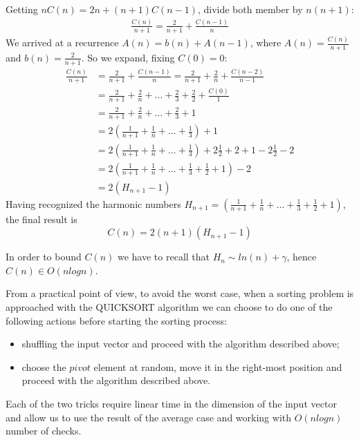 Getting $nC(n) = 2n + (n+1)C(n-1)$, divide both member by $n(n+1)$:
\begin{displaymath}
  \begin{split}
    \frac{C(n)}{n+1}  = \frac{2}{n+1} +
    \frac{C(n-1)}{n}
  \end{split}
\end{displaymath}
We arrived at a recurrence $A(n) = b(n) + A(n-1)$, where $A(n) =
\frac{C(n)}{n+1} $ and $b(n) = \frac{2}{n+1} $. So we expand, fixing
$C(0) = 0$:
\begin{displaymath}
  \begin{split}
    \frac{C(n)}{n+1} &= \frac{2}{n+1} + \frac{C(n-1)}{n} =
    \frac{2}{n+1} +
    \frac{2}{n} + \frac{C(n-2)}{n-1}\\
    &= \frac{2}{n+1} + \frac{2}{n} + \ldots +
    \frac{2}{3} + \frac{2}{2} + \frac{C(0)}{1}\\
    &= \frac{2}{n+1} + \frac{2}{n} + \ldots +
    \frac{2}{3} + 1\\
    &= 2\left(\frac{1}{n+1} + \frac{1}{n} + \ldots +
      \frac{1}{3}\right) + 1\\
    &= 2\left(\frac{1}{n+1} + \frac{1}{n} + \ldots +
      \frac{1}{3}\right) +2\frac{1}{2} + 2
    + 1 -2\frac{1}{2} - 2\\
    &= 2\left(\frac{1}{n+1} + \frac{1}{n} + \ldots +
      \frac{1}{3}+
      \frac{1}{2}+
      1\right) -2 \\
    &= 2(H_{n+1}-1)
  \end{split}
\end{displaymath}
Having recognized the harmonic numbers $H_{n+1}=\left(\frac{1}{n+1} +
  \frac{1}{n} + \ldots + \frac{1}{3}+ \frac{1}{2}+ 1\right)$, the
final result is $$C(n) = 2(n+1)(H_{n+1}-1)$$

In order to bound $C(n)$ we have to recall that $H_n \sim ln(n) +
\gamma$, hence $C(n) \in O(nlogn)$.

From a practical point of view, to avoid the worst case, when a
sorting problem is approached with the QUICKSORT algorithm we can
choose to do one of the following actions before starting the sorting
process:
\begin{itemize}
\item shuffling the input vector and proceed with the algorithm
  described above;
\item choose the $pivot$ element at random, move it in the right-most
  position and proceed with the algorithm described above.
\end{itemize}
Each of the two tricks require linear time in the dimension of the
input vector and allow us to use the result of the average case and
working with $O(nlogn)$ number of checks.


